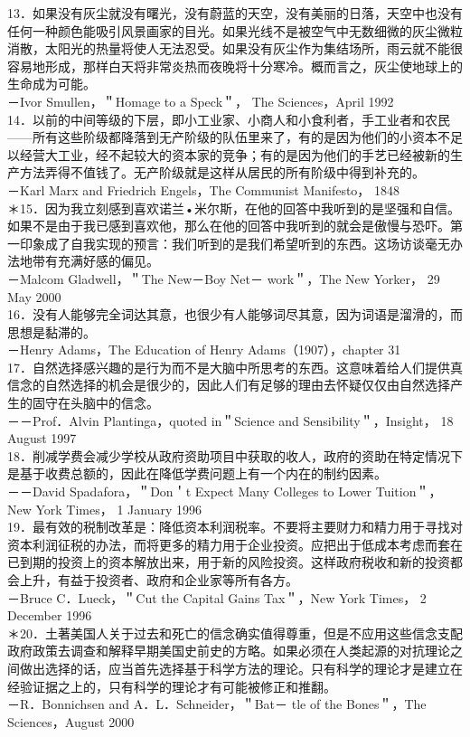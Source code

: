 13．如果没有灰尘就没有曙光，没有蔚蓝的天空，没有美丽的日落，天空中也没有任何一种颜色能吸引风景画家的目光。如果光线不是被空气中无数细微的灰尘微粒消散，太阳光的热量将使人无法忍受。如果没有灰尘作为集结场所，雨云就不能很容易地形成，那样白天将非常炎热而夜晚将十分寒冷。概而言之，灰尘使地球上的生命成为可能。\\
－Ivor Smullen，＂Homage to a Speck＂， The Sciences，April 1992\\
14．以前的中间等级的下层，即小工业家、小商人和小食利者，手工业者和农民——所有这些阶级都降落到无产阶级的队伍里来了，有的是因为他们的小资本不足以经营大工业，经不起较大的资本家的竞争；有的是因为他们的手艺已经被新的生产方法弄得不值钱了。无产阶级就是这样从居民的所有阶级中得到补充的。\\
－Karl Marx and Friedrich Engels，The Communist Manifesto， 1848\\
＊15．因为我立刻感到喜欢诺兰•米尔斯，在他的回答中我听到的是坚强和自信。如果不是由于我已感到喜欢他，那么在他的回答中我听到的就会是傲慢与恐吓。第一印象成了自我实现的预言：我们听到的是我们希望听到的东西。这场访谈毫无办法地带有充满好感的偏见。\\
－Malcom Gladwell，＂The New－Boy Net－ work＂，The New Yorker， 29 May 2000\\
16．没有人能够完全词达其意，也很少有人能够词尽其意，因为词语是溜滑的，而思想是黏滞的。\\
－Henry Adams，The Education of Henry Adams（1907），chapter 31\\
17．自然选择感兴趣的是行为而不是大脑中所思考的东西。这意味着给人们提供真信念的自然选择的机会是很少的，因此人们有足够的理由去怀疑仅仅由自然选择产生的固守在头脑中的信念。\\
－－Prof．Alvin Plantinga，quoted in＂Science and Sensibility＂，Insight， 18 August 1997\\
18．削减学费会减少学校从政府资助项目中获取的收人，政府的资助在特定情况下是基于收费总额的，因此在降低学费问题上有一个内在的制约因素。\\
－－David Spadafora，＂Don＇t Expect Many Colleges to Lower Tuition＂，New York Times， 1 January 1996\\
19．最有效的税制改革是：降低资本利润税率。不要将主要财力和精力用于寻找对资本利润征税的办法，而将更多的精力用于企业投资。应把出于低成本考虑而套在已到期的投资上的资本解放出来，用于新的风险投资。这样政府税收和新的投资都会上升，有益于投资者、政府和企业家等所有各方。\\
－Bruce C．Lueck，＂Cut the Capital Gains Tax＂，New York Times， 2 December 1996\\
＊20．土著美国人关于过去和死亡的信念确实值得尊重，但是不应用这些信念支配政府政策去调查和解释早期美国史前史的方略。如果必须在人类起源的对抗理论之间做出选择的话，应当首先选择基于科学方法的理论。只有科学的理论才是建立在经验证据之上的，只有科学的理论才有可能被修正和推翻。\\
－R．Bonnichsen and A．L．Schneider，＂Bat－ tle of the Bones＂，The Sciences，August 2000

